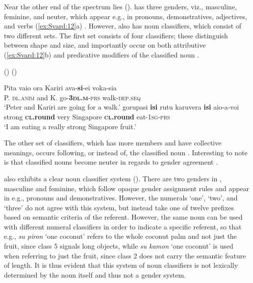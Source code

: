 \documentclass[output=collectionpaper]{langsci/langscibook}
\begin{document}
Near the other end of the spectrum lies  ().  has three genders, viz., masculine, feminine, and neuter, which appear e.g., in pronouns, demonstratives, adjectives, and verbs (\ref{ex:Svard:12}a) \citep{Robinson2011}. However,  also has noun classifiers, which consist of two different sets. The first set consists of four classifiers; these distinguish between shape and size, and importantly occur on both attributive (\ref{ex:Svard:12}b) and predicative modifiers of the classified noun \citep[50]{Robinson2011}.


\ea
\label{ex:Svard:12}
 () (\citealt[149, 50]{Robinson2011})\\
\begin{xlist}
\ex
\gll Pita vaio ora Kariri ava-\textbf{si}{}-ei voka-sia\\
     P. \textsc{dl.anim} and K. go-\textsc{\textbf{3dl.m}}\textsc{{}-prs} walk-\textsc{dep.seq}\\
\glt `Peter and Kariri are going for a walk.'
\ex
\gll gorupasi \textbf{isi} rutu karuvera \textbf{isi} aio-a-voi\\
     strong \textsc{\textbf{cl.}}\textbf{round} very Singapore \textsc{\textbf{cl}}\textbf{.round} eat-\textsc{1sg-prs}\\
\glt `I am eating a really strong Singapore fruit.'
\end{xlist}
\z


The other set of classifiers, which has more members and have collective meanings, occurs following, or instead of, the classified noun \citep[51]{Robinson2011}. Interesting to note is that classified nouns become neuter in regards to gender agreement \citep[53]{Robinson2011}.


 also exhibits a clear noun classifier system (). There are two genders in , masculine and feminine, which follow opaque gender assignment rules and appear in e.g., pronouns and demonstratives. However, the numerals `one', `two', and `three' do not agree with this system, but instead take one of twelve prefixes based on semantic criteria of the referent. However, the same noun can be used with different numeral classifiers in order to indicate a specific referent, so that e.g., \textit{su piron} `one coconut' refers to the whole coconut palm and not just the fruit, since class 5 signals long objects, while \textit{su kamon} `one coconut' is used when referring to just the fruit, since class 2 does not carry the semantic feature of length. It is thus evident that this system of noun classifiers is not lexically determined by the noun itself and thus not a gender system.
\end{document}
